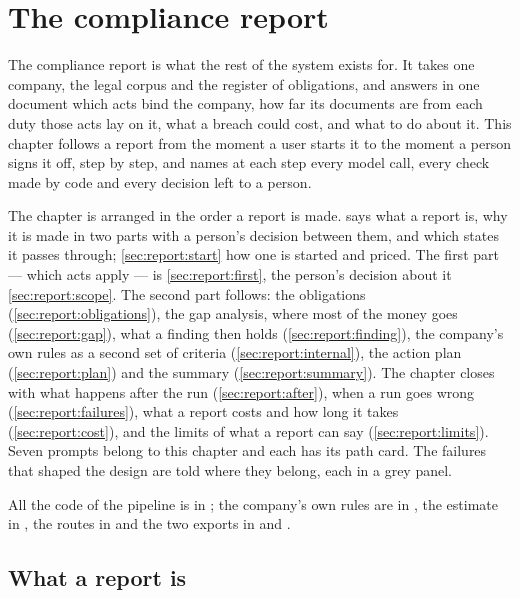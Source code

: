 \chapter{The compliance report}\label{ch:report}

The compliance report is what the rest of the system exists for. It takes one company, the
legal corpus and the register of obligations, and answers in one document which acts bind the
company, how far its documents are from each duty those acts lay on it, what a breach could
cost, and what to do about it. This chapter follows a report from the moment a user starts it
to the moment a person signs it off, step by step, and names at each step every model call,
every check made by code and every decision left to a person.

The chapter is arranged in the order a report is made.  says what a
report is, why it is made in two parts with a person's decision between them, and which states
it passes through; \cref{sec:report:start} how one is started and priced. The first part ---
which acts apply --- is \cref{sec:report:first}, the person's decision about it
\cref{sec:report:scope}. The second part follows: the obligations
(\cref{sec:report:obligations}), the gap analysis, where most of the money goes
(\cref{sec:report:gap}), what a finding then holds (\cref{sec:report:finding}), the company's
own rules as a second set of criteria (\cref{sec:report:internal}), the action plan
(\cref{sec:report:plan}) and the summary (\cref{sec:report:summary}). The chapter closes with
what happens after the run (\cref{sec:report:after}), when a run goes wrong
(\cref{sec:report:failures}), what a report costs and how long it takes
(\cref{sec:report:cost}), and the limits of what a report can say (\cref{sec:report:limits}).
Seven prompts belong to this chapter and each has its path card. The failures that shaped the
design are told where they belong, each in a grey panel.

All the code of the pipeline is in ; the company's own rules are in
, the estimate in , the routes in
 and the two exports in  and
.


\section{What a report is}\label{sec:report:what}

